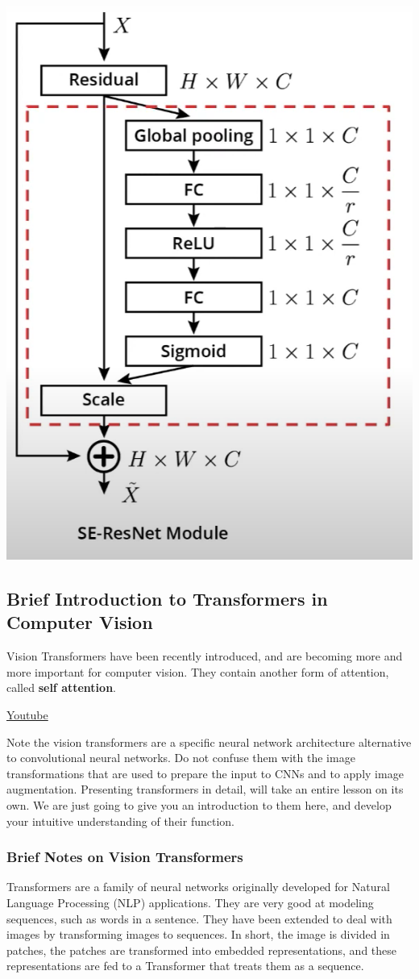\includegraphics[width=0.25\linewidth]{img//cnn//transfer/se_in_resnet.png}
\label{fig:se_in_resnet}

\subsection{Brief Introduction to Transformers in Computer Vision}

Vision Transformers have been recently introduced, and are becoming more and more important for computer vision. They contain another form of attention, called \textbf{self attention}. \newline

\href{https://www.youtube.com/watch?v=E5HGkrHoL9I&ab_channel=Udacity}{Youtube} \newline

Note the vision transformers are a specific neural network architecture alternative to convolutional neural networks. Do not confuse them with the image transformations that are used to prepare the input to CNNs and to apply image augmentation. Presenting transformers in detail, will take an entire lesson on its own. We are just going to give you an introduction to them here, and develop your intuitive understanding of their function.

\subsubsection{Brief Notes on Vision Transformers}

Transformers are a family of neural networks originally developed for Natural Language Processing (NLP) applications. They are very good at modeling sequences, such as words in a sentence. They have been extended to deal with images by transforming images to sequences. In short, the image is divided in patches, the patches are transformed into embedded representations, and these representations are fed to a Transformer that treats them as a sequence. \newline


